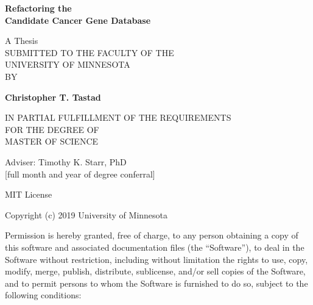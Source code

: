\documentclass[10pt]{report}
\title{}
\author{Christopher T. Tastad}
\date{day month year}
\begin{document}



\thispagestyle{empty}
\begin{center}
    \vspace*{1cm}

    \Huge
    \textbf{Refactoring the\\Candidate Cancer Gene Database}

    \vspace{1cm}
    \Large
    A Thesis\\
    SUBMITTED TO THE FACULTY OF THE\\
    UNIVERSITY OF MINNESOTA\\
    BY\\

    \vspace{1.5cm}

    \LARGE
    \textbf{Christopher T. Tastad}

    \vspace{3cm}

    \Large
    IN PARTIAL FULFILLMENT OF THE REQUIREMENTS\\
    FOR THE DEGREE OF\\
    MASTER OF SCIENCE\\

    \vspace{1cm}

    Adviser: Timothy K. Starr, PhD\\

    [full month and year of degree conferral]

\end{center}

\newpage
\thispagestyle{empty}

MIT License

Copyright (c) 2019 University of Minnesota

Permission is hereby granted, free of charge, to any person obtaining a copy of this software and associated documentation files (the ``Software''), to deal in the Software without restriction, including without limitation the rights to use, copy, modify, merge, publish, distribute, sublicense, and/or sell copies of the Software, and to permit persons to whom the Software is furnished to do so, subject to the following conditions:
\end{document}
